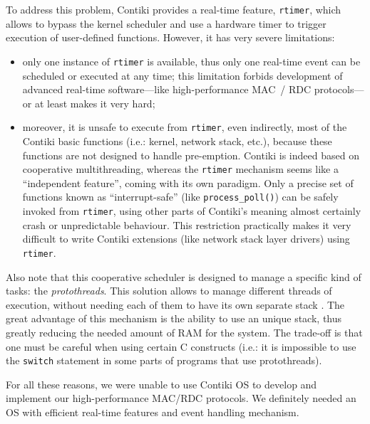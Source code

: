 \documentclass[a4paper,twoside]{article}
\begin{document}
To address this problem, Contiki provides a real-time feature,
\texttt{rtimer}, which allows to bypass the kernel scheduler and use
a hardware timer to trigger execution of user-defined functions. However,
it has very severe limitations:

\begin{itemize}

\item only one instance of \texttt{rtimer} is available, thus only one
real-time event can be scheduled or executed at any time; this limitation
forbids development of advanced real-time software---like high-performance
MAC~/ RDC protocols---or at least makes it very hard;

\item moreover, it is unsafe to execute from \texttt{rtimer}, even
indirectly, most of the Contiki basic functions (i.e.: kernel, network
stack, etc.), because these functions are not designed to handle pre-emption.
Contiki is indeed based on cooperative multithreading, whereas the
\texttt{rtimer} mechanism seems like a ``independent feature'', coming
with its own paradigm.
Only a precise set of functions known as ``interrupt-safe'' (like
\texttt{process\_poll()}) can be safely invoked from \texttt{rtimer},
using other parts of Contiki's meaning almost certainly crash or
unpredictable behaviour. This restriction practically makes it very
difficult to write Contiki extensions (like network stack layer drivers)
using \texttt{rtimer}.


\end{itemize}

Also note that this cooperative scheduler is designed to manage a specific
kind of tasks: the \emph{protothreads}. This solution allows to manage
different threads of execution, without needing each of them to have
its own separate stack \cite{Protothreads}. The great advantage of
this mechanism is the ability to use an unique stack, thus greatly
reducing the needed amount of RAM for the system. The trade-off is
that one must be careful when using certain C constructs (i.e.:
it is impossible to use the \texttt{switch} statement in
some parts of programs that use protothreads).

For all these reasons, we were unable to use Contiki OS to develop and
implement our high-performance MAC/RDC protocols. We definitely needed
an OS with efficient real-time features and event handling mechanism.
\end{document}
